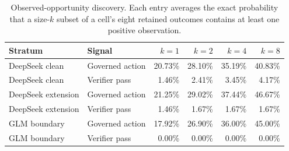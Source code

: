
\begin{table}[H]
\centering
\caption{Observed-opportunity discovery. Each entry averages the exact probability that a size-$k$ subset of a cell's eight retained outcomes contains at least one positive observation.}
\label{tab:opportunity}
\small
\begin{tabular}{@{}llrrrr@{}}
\toprule
Stratum & Signal & $k=1$ & $k=2$ & $k=4$ & $k=8$ \\
\midrule
DeepSeek clean & Governed action & 20.73\% & 28.10\% & 35.19\% & 40.83\% \\
DeepSeek clean & Verifier pass & 1.46\% & 2.41\% & 3.45\% & 4.17\% \\
DeepSeek extension & Governed action & 21.25\% & 29.02\% & 37.44\% & 46.67\% \\
DeepSeek extension & Verifier pass & 1.46\% & 1.67\% & 1.67\% & 1.67\% \\
GLM boundary & Governed action & 17.92\% & 26.90\% & 36.00\% & 45.00\% \\
GLM boundary & Verifier pass & 0.00\% & 0.00\% & 0.00\% & 0.00\% \\
\bottomrule
\end{tabular}
\end{table}
